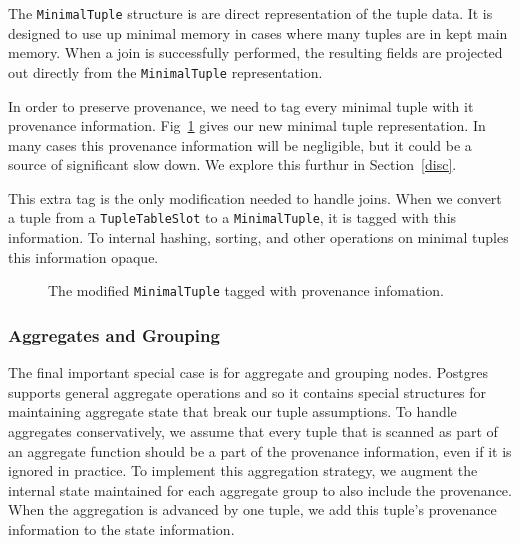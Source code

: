 The \texttt{MinimalTuple} structure is are direct representation of the tuple data. It is designed to use up minimal memory in cases where many tuples are in kept main memory. When a join is successfully performed, the resulting fields are projected out directly from the \texttt{MinimalTuple} representation. 

In order to preserve provenance, we need to tag every minimal tuple with it provenance information. Fig~\ref{mintup} gives our new minimal tuple representation. In many cases this provenance information will be negligible, but it could be a source of significant slow down. We explore this furthur in Section~\ref{disc}.

This extra tag is the only modification needed to handle joins. When we convert a tuple from a \texttt{TupleTableSlot} to a \texttt{MinimalTuple}, it is tagged with this information. To internal hashing, sorting, and other operations on minimal tuples this information opaque.   

\begin{figure}
  \centering
  \label{mintup}
  \caption {The modified \texttt{MinimalTuple} tagged with provenance infomation.}
\end{figure}





\subsubsection{Aggregates and Grouping}

The final important special case is for aggregate and grouping nodes. Postgres supports general aggregate operations and so it contains special structures for maintaining aggregate state that break our tuple assumptions. To handle aggregates conservatively, we assume that every tuple that is scanned as part of an  aggregate function should be a part of the provenance information, even if it is ignored in practice. To implement this aggregation strategy, we augment the internal state maintained for each aggregate group to also include the provenance. When the aggregation is advanced by one tuple, we add this tuple's provenance information to the state information. 


